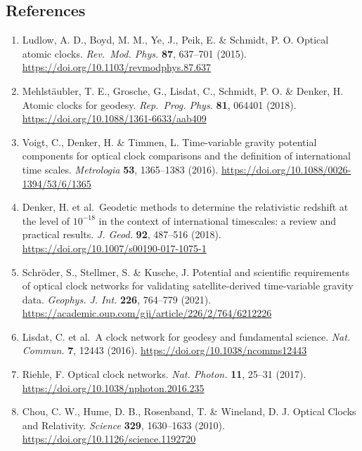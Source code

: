 \documentclass[
  12pt,
  a4paper,
]{article}
\providecommand{\tightlist}{%
  \setlength{\itemsep}{0pt}\setlength{\parskip}{0pt}}
\begin{document}
\clearpage

\singlespacing\fontsize{11}{13}\selectfont

\hypertarget{references}{%
\subsection{References}\label{references}}

\begin{enumerate}
\def\labelenumi{\arabic{enumi}.}
\tightlist
\item
  Ludlow, A. D., Boyd, M. M., Ye, J., Peik, E. \& Schmidt, P. O. Optical
  atomic clocks. \emph{Rev.~Mod. Phys.} \textbf{87}, 637--701 (2015).
  \url{https://doi.org/10.1103/revmodphys.87.637}
\item
  Mehlstäubler, T. E., Grosche, G., Lisdat, C., Schmidt, P. O. \&
  Denker, H. Atomic clocks for geodesy. \emph{Rep.~Prog. Phys.}
  \textbf{81}, 064401 (2018).
  \url{https://doi.org/10.1088/1361-6633/aab409}
\item
  Voigt, C., Denker, H. \& Timmen, L. Time-variable gravity potential
  components for optical clock comparisons and the definition of
  international time scales. \emph{Metrologia} \textbf{53}, 1365--1383
  (2016). \url{https://doi.org/10.1088/0026-1394/53/6/1365}
\item
  Denker, H. et al.~Geodetic methods to determine the relativistic
  redshift at the level of \(10^{-18}\) in the context of international
  timescales: a review and practical results. \emph{J. Geod.}
  \textbf{92}, 487--516 (2018).
  \url{https://doi.org/10.1007/s00190-017-1075-1}
\item
  Schröder, S., Stellmer, S. \& Kusche, J. Potential and scientific
  requirements of optical clock networks for validating
  satellite-derived time-variable gravity data. \emph{Geophys. J. Int.}
  \textbf{226}, 764--779 (2021).
  \url{https://academic.oup.com/gji/article/226/2/764/6212226}
\item
  Lisdat, C. et al.~A clock network for geodesy and fundamental science.
  \emph{Nat. Commun.} \textbf{7}, 12443 (2016).
  \url{https://doi.org/10.1038/ncomms12443}
\item
  Riehle, F. Optical clock networks. \emph{Nat. Photon.} \textbf{11},
  25--31 (2017). \url{https://doi.org/10.1038/nphoton.2016.235}
\item
  Chou, C. W., Hume, D. B., Rosenband, T. \& Wineland, D. J. Optical
  Clocks and Relativity. \emph{Science} \textbf{329}, 1630--1633 (2010).
  \url{https://doi.org/10.1126/science.1192720}

\end{enumerate}
\end{document}
